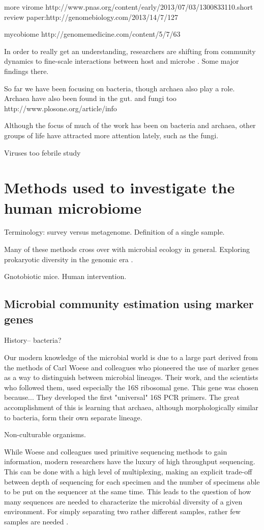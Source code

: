 \documentclass{amsart}
\begin{document}
more virome
http://www.pnas.org/content/early/2013/07/03/1300833110.short
review paper:http://genomebiology.com/2013/14/7/127

mycobiome
http://genomemedicine.com/content/5/7/63


In order to really get an understanding, researchers are shifting from community dynamics to fine-scale interactions between host and microbe \cite{hooper2012interactions}.
Some major findings there.

So far we have been focusing on bacteria, though archaea also play a role.
Archaea have also been found in the gut.
and fungi too
http://www.plosone.org/article/info%

Although the focus of much of the work has been on bacteria and archaea, other groups of life have attracted more attention lately, such as the fungi.

Viruses too
febrile study \cite{wylie2012sequence}


\section{Methods used to investigate the human microbiome}

Terminology: survey versus metagenome.
Definition of a single sample.

Many of these methods cross over with microbial ecology in general.
Exploring prokaryotic diversity in the genomic era \cite{hugenholtz2002review}.

Gnotobiotic mice.
Human intervention.


\subsection{Microbial community estimation using marker genes}
History-- bacteria?

Our modern knowledge of the microbial world is due to a large part derived from the methods of Carl Woese and colleagues who pioneered the use of marker genes as a way to distinguish between microbial lineages.
Their work, and the scientists who followed them, used especially the 16S ribosomal gene.
This gene was chosen because...
They developed the first "universal" 16S PCR primers.
The great accomplishment of this is learning that archaea, although morphologically similar to bacteria, form their own separate lineage.

Non-culturable organisms.

While Woese and colleagues used primitive sequencing methods to gain information, modern researchers have the luxury of high throughput sequencing.
This can be done with a high level of multiplexing, making an explicit trade-off between depth of sequencing for each specimen and the number of specimens able to be put on the sequencer at the same time.
This leads to the question of how many sequences are needed to characterize the microbial diversity of a given environment.
For simply separating two rather different samples, rather few samples are needed \cite{kuczynski2010microbial}.
\end{document}
